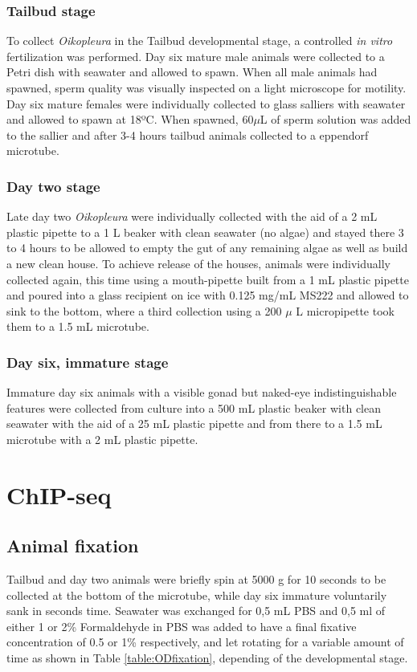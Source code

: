 \documentclass[11pt,twoside,a4paper]{report}
\begin{document}
			\subsubsection{Tailbud stage}
			To collect \textit{Oikopleura} in the Tailbud developmental stage, a controlled \textit{in vitro} fertilization was performed. Day six mature male animals were collected to a Petri dish with seawater and allowed to spawn. When all male animals had spawned, sperm quality was visually inspected on a light microscope for motility. Day six mature females were individually collected to glass salliers with seawater and allowed to spawn at 18ºC. When spawned, 60$\mu$L of sperm solution was added to the sallier and after 3-4 hours tailbud animals collected to a eppendorf microtube.
			
			\subsubsection{Day two stage}
			Late day two \textit{Oikopleura} were individually collected with the aid of a 2 mL plastic pipette to a 1 L beaker with clean seawater (no algae) and stayed there 3 to 4 hours to be allowed to empty the gut of any remaining algae as well as build a new clean house.
			To achieve release of the houses, animals were individually collected again, this time using a mouth-pipette built from a 1 mL plastic pipette and poured into a glass recipient on ice with 0.125 mg/mL MS222 and allowed to sink to the bottom, where a third collection using a 200 $\mu$
			L micropipette took them to a 1.5 mL microtube.
			
			\subsubsection{Day six, immature stage}
			Immature day six animals with a visible gonad but naked-eye indistinguishable features were collected from culture into a 500 mL plastic beaker with clean seawater with the aid of a 25 mL plastic pipette and from there to a 1.5 mL microtube with a 2 mL plastic pipette. 
		
	
	\section{ChIP-seq}
		\subsection{Animal fixation}
			Tailbud and day two animals were briefly spin at 5000 g for 10 seconds to be collected at the bottom of the microtube, while day six immature voluntarily sank in seconds time. Seawater was exchanged for 0,5 mL PBS and 0,5 ml of either 1 or 2\% Formaldehyde in PBS was added to have a final fixative concentration of 0.5 or 1\% respectively, and let rotating for a variable amount of time as shown in Table \ref{table:ODfixation}, depending of the developmental stage. %
			
\end{document}
